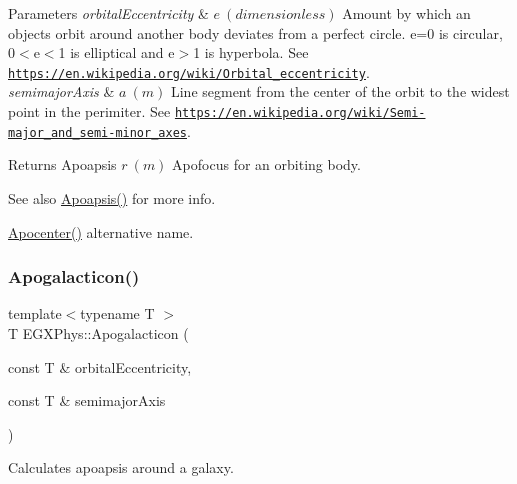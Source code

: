 \begin{DoxyParams}{Parameters}
{\em orbital\+Eccentricity} & $ e\ (dimensionless)$ Amount by which an objects orbit around another body deviates from a perfect circle. e=0 is circular, 0$<$e$<$1 is elliptical and e$>$1 is hyperbola. See \href{https://en.wikipedia.org/wiki/Orbital_eccentricity}{\tt https\+://en.\+wikipedia.\+org/wiki/\+Orbital\+\_\+eccentricity}. \\
\hline
{\em semimajor\+Axis} & $ a\ (m)$ Line segment from the center of the orbit to the widest point in the perimiter. See \href{https://en.wikipedia.org/wiki/Semi-major_and_semi-minor_axes}{\tt https\+://en.\+wikipedia.\+org/wiki/\+Semi-\/major\+\_\+and\+\_\+semi-\/minor\+\_\+axes}. \\
\hline
\end{DoxyParams}
\begin{DoxyReturn}{Returns}
Apoapsis $ r\ (m)$ Apofocus for an orbiting body. 
\end{DoxyReturn}
\begin{DoxySeeAlso}{See also}
\mbox{\hyperlink{group___e_g_x_phys-_apoapsis_gaf962e650bf84a568458e8eb39b1c61ba}{Apoapsis()}} for more info. 

\mbox{\hyperlink{group___e_g_x_phys-_apoapsis_ga5e51a53e2f974264bada34f159fdc948}{Apocenter()}} alternative name. 
\end{DoxySeeAlso}
\mbox{\label{group___e_g_x_phys-_apoapsis_ga09b4c7d5e971dc28e1ba37f479958c27}} 
\subsubsection{\texorpdfstring{Apogalacticon()}{Apogalacticon()}}
{\footnotesize\ttfamily template$<$typename T $>$ \\
T E\+G\+X\+Phys\+::\+Apogalacticon (\begin{DoxyParamCaption}\item[{const T \&}]{orbital\+Eccentricity,  }\item[{const T \&}]{semimajor\+Axis }\end{DoxyParamCaption})}



Calculates apoapsis around a galaxy. 


